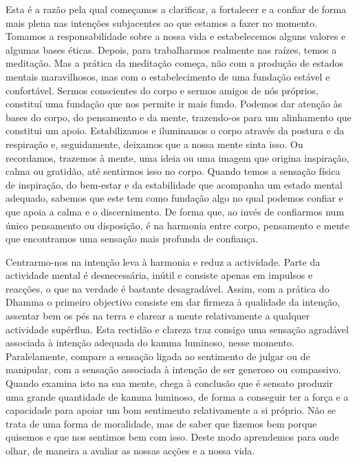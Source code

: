 Esta é a razão pela qual começamos a clarificar, a fortalecer e a confiar de forma mais plena nas intenções subjacentes ao que estamos a fazer no momento. Tomamos a responsabilidade sobre a nossa vida e estabelecemos alguns valores e algumas bases éticas. Depois, para trabalharmos realmente nas raízes, temos a meditação. Mas a prática da meditação começa, não com a produção de estados mentais maravilhosos, mas com o estabelecimento de uma fundação estável e confortável. Sermos conscientes do corpo e sermos amigos de nós próprios, constituí uma fundação que nos permite ir mais fundo. Podemos dar atenção às bases do corpo, do pensamento e da mente, trazendo-os para um alinhamento que constitui um apoio. Estabilizamos e iluminamos o corpo através da postura e da respiração e, seguidamente, deixamos que a nossa mente sinta isso. Ou recordamos, trazemos à mente, uma ideia ou uma imagem que origina inspiração, calma ou gratidão, até sentirmos isso no corpo. Quando temos a sensação física de inspiração, do bem-estar e da estabilidade que acompanha um estado mental adequado, sabemos que este tem como fundação algo no qual podemos confiar e que apoia a calma e o discernimento. De forma que, ao invés de confiarmos num único pensamento ou disposição, é na harmonia entre corpo, pensamento e mente que encontramos uma sensação mais profunda de confiança.

Centrarmo-nos na intenção leva à harmonia e reduz a actividade. Parte da actividade mental é desnecessária, inútil e consiste apenas em impulsos e reacções, o que na verdade é bastante desagradável. Assim, com a prática do Dhamma o primeiro objectivo consiste em dar firmeza à qualidade da intenção, assentar bem os pés na terra e clarear a mente relativamente a qualquer actividade supérflua. Esta rectidão e clareza traz consigo uma sensação agradável associada à intenção adequada do kamma luminoso, nesse momento. Paralelamente, compare a sensação ligada ao sentimento de julgar ou de manipular, com a sensação associada à intenção de ser generoso ou compassivo. Quando examina isto na sua mente, chega à conclusão que é sensato produzir uma grande quantidade de kamma luminoso, de forma a conseguir ter a força e a capacidade para apoiar um bom sentimento relativamente a si próprio. Não se trata de uma forma de moralidade, mas de saber que fizemos bem porque quisemos e que nos sentimos bem com isso. Deste modo aprendemos para onde olhar, de maneira a avaliar as nossas acções e a nossa vida.

